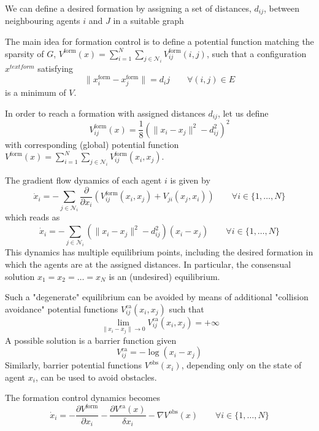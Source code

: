 \documentclass{book}
\theoremstyle{theoremv2}
\theoremstyle{defv2}
\theoremstyle{remark}
\theoremstyle{remark}
\theoremstyle{definition}
\theoremstyle{definition}
\begin{document}
 We can define a desired formation by assigning a set of distances, $d_{ij}$, between neighbouring agents $i$ and $J$ in a suitable graph 
 
 The main idea for formation control is to define a potential function matching the sparsity of $G$, $V^{\text{form}}(x) = \sum_{i=1}^{N}\sum_{j\in\mathcal{N}_i}V_{ij}^{\text{form}}(i,j)$, such that a configuration $x^{text{form}}$ satisfying 
 \[
     \|x_i^{\text{form}}-x_j^{\text{form}}\| = d_ij \qquad \forall (i,j)\in E
 \]
 is a minimum of $V$.

 In order to reach a formation with assigned distances $d_{ij}$, let us define 
 \[
     V_{ij}^{\text{form}}(x) = \displaystyle\frac{1}{8} \left(\|x_i-x_j\|^2-d_{ij}^2\right)^2
 \]
 with corresponding (global) potential function $V^{\text{form}}(x) = \displaystyle\sum_{i=1}^{N}\displaystyle\sum_{j\in\mathcal{N}_i}V_{ij}^\text{form}(x_i,x_j)$.

 The gradient flow dynamics of each agent $i$ is given by 
 \[
     \dot{x}_i = - \displaystyle\sum_{j\in\mathcal{N}_i}\displaystyle\frac{\partial}{\partial x_i} \left(V_{ij}^\text{form}(x_i,x_j)+V_{ji}(x_j,x_i)\right) \qquad \forall i \in \{1,\dots,N\}
 \]
 which reads as 
 \[
     \dot{x}_i = - \displaystyle\sum_{j\in\mathcal{N}_i} \left(\|x_i-x_j\|^2-d_{ij}^2\right)(x_i-x_j) \qquad \forall i \in \{1,\dots,N\}
 \]
This dynamics has multiple equilibrium points, including the desired formation in which the agents are at the assigned distances. In particular, the consensual solution $x_1=x_2=\dots=x_N$ is an (undesired) equilibrium.

Such a "degenerate" equilibrium can be avoided by means of additional "collision avoidance" potential functions $V_{ij}^\text{ca}(x_i,x_j)$ such that 
\[
    \lim_{\|x_i-x_j\|\to 0} V_{ij}^\text{ca}(x_i,x_j)=+\infty
\]
A possible solution is a barrier function given 
\[
    V_{ij}^\text{ca} = -\log(x_i-x_j)
\]
Similarly, barrier potential functions $V^\text{obs}(x_i)$, depending only on the state of agent $x_i$, can be used to avoid obstacles. 

The formation control dynamics becomes 
\[
    \dot{x}_i = - \displaystyle\frac{\partial V^\text{form}}{\partial x_i} - \displaystyle\frac{\partial V^\text{ca}(x)}{\delta x_i} - \nabla V^\text{obs}(x) \qquad \forall i\in\{1,\dots,N\}
\]
\end{document}
